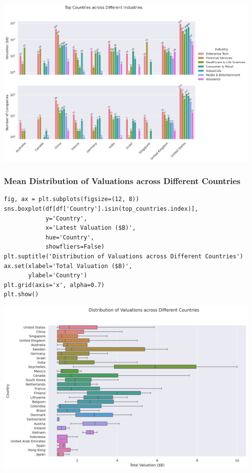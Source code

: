 \documentclass[a4paper,12pt]{article}
\begin{document}
\begin{center}
\includegraphics[width=.9\linewidth]{./.ob-jupyter/33900e6d5fea2d6aa2730af6c08c1029c0b26b20.png}
\label{}
\end{center}
\subsubsection{Mean Distribution of Valuations across Different Countries}
\label{sec:org2567379}

\begin{verbatim}
fig, ax = plt.subplots(figsize=(12, 8))
sns.boxplot(df[df['Country'].isin(top_countries.index)],
            y='Country',
            x='Latest Valuation ($B)',
            hue='Country',
            showfliers=False)
plt.suptitle('Distribution of Valuations across Different Countries')
ax.set(xlabel='Total Valuation ($B)',
       ylabel='Country')
plt.grid(axis='x', alpha=0.7)
plt.show()
\end{verbatim}

\begin{center}
\includegraphics[width=.9\linewidth]{./.ob-jupyter/39fd31b873ab703c2f80e4c7c699be49ab648904.png}
\label{}
\end{center}
\end{document}
